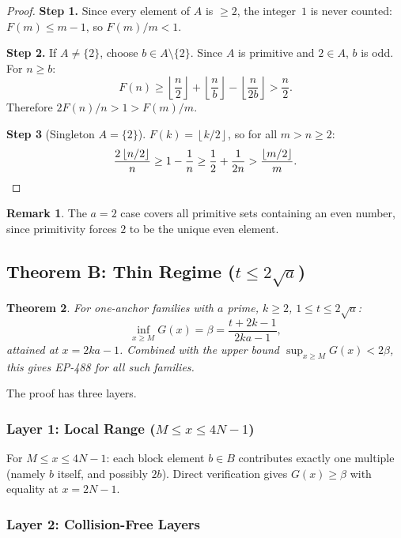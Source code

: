 \documentclass[11pt,a4paper]{article}
\newtheorem{theorem}{Theorem}[section]
\theoremstyle{definition}
\newtheorem{remark}[theorem]{Remark}
\newcommand{\floor}[1]{\left\lfloor #1 \right\rfloor}
\begin{document}
\begin{proof}
\textbf{Step 1.} Since every element of $A$ is $\geq 2$, the integer~$1$ 
is never counted: $F(m) \leq m-1$, so $F(m)/m < 1$.

\textbf{Step 2.} If $A \neq \{2\}$, choose $b \in A \setminus \{2\}$. 
Since $A$ is primitive and $2 \in A$, $b$ is odd. For $n \geq b$:
\[
F(n) \geq \floor{\frac{n}{2}} + \floor{\frac{n}{b}} 
- \floor{\frac{n}{2b}} > \frac{n}{2}.
\]
Therefore $2F(n)/n > 1 > F(m)/m$.

\textbf{Step 3} (Singleton $A = \{2\}$). $F(k) = \floor{k/2}$, so for 
all $m > n \geq 2$:
\[
\frac{2\floor{n/2}}{n} \geq 1 - \frac{1}{n} \geq \frac{1}{2} + \frac{1}{2n}
> \frac{\floor{m/2}}{m}. \qedhere
\]
\end{proof}

\begin{remark}
The $a=2$ case covers all primitive sets containing an even number, since 
primitivity forces $2$ to be the unique even element.
\end{remark}

\subsection{Theorem B: Thin Regime ($t \leq 2\sqrt{a}$)}

\begin{theorem}\label{thm:thin}
For one-anchor families with $a$ prime, $k \geq 2$, 
$1 \leq t \leq 2\sqrt{a}$:
\[
\inf_{x \geq M} G(x) = \beta = \frac{t+2k-1}{2ka-1},
\]
attained at $x = 2ka-1$. Combined with the upper bound 
$\sup_{x \geq M} G(x) < 2\beta$, this gives EP-488 for all such families.
\end{theorem}

The proof has three layers.

\subsubsection{Layer 1: Local Range ($M \leq x \leq 4N-1$)}

For $M \leq x \leq 4N-1$: each block element $b \in B$ contributes 
exactly one multiple (namely $b$ itself, and possibly $2b$). Direct 
verification gives $G(x) \geq \beta$ with equality at $x = 2N-1$.

\subsubsection{Layer 2: Collision-Free Layers}
\end{document}
